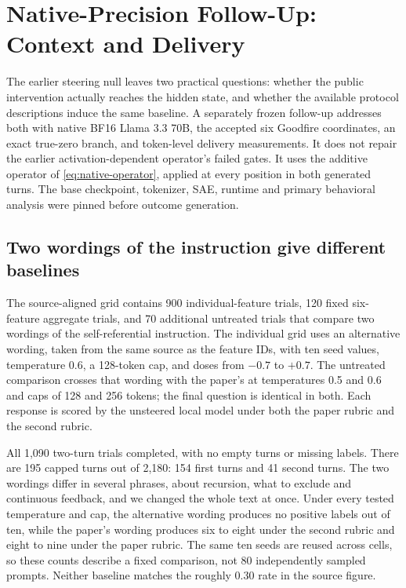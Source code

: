 \section{Native-Precision Follow-Up: Context and Delivery}
\label{sec:source-alignment}

The earlier steering null leaves two practical questions: whether the public
intervention actually reaches the hidden state, and whether the available
protocol descriptions induce the same baseline. A separately frozen follow-up
addresses both with native BF16 Llama 3.3 70B, the accepted six Goodfire
coordinates, an exact true-zero branch, and token-level delivery measurements.
It does not repair the earlier activation-dependent operator's failed gates.
It uses the additive operator of \cref{eq:native-operator}, applied at every
position in both generated turns. The base checkpoint, tokenizer, SAE,
runtime and primary behavioral analysis were pinned before outcome
generation.

\subsection{Two wordings of the instruction give different baselines}

The source-aligned grid contains 900 individual-feature trials, 120 fixed
six-feature aggregate trials, and 70 additional untreated trials that compare
two wordings of the self-referential instruction. The individual grid uses an
alternative wording, taken from the same source as the feature IDs, with ten
seed values,
temperature 0.6, a 128-token cap, and doses from $-0.7$ to $+0.7$. The
untreated comparison crosses that wording with the paper's at temperatures
0.5 and 0.6 and caps of 128 and 256 tokens; the final question is identical in
both. Each response is scored by the unsteered local model under both the
paper rubric and the second rubric.

All 1,090 two-turn trials completed, with no empty turns or missing labels.
There are 195 capped turns out of 2,180: 154 first turns and 41 second turns.
The two wordings differ in several phrases, about recursion, what to exclude
and continuous feedback, and we changed the whole text at once. Under every
tested temperature and cap, the alternative wording produces no positive
labels out of ten, while the paper's wording produces six to eight under the
second rubric and eight to nine under the paper rubric. The same ten seeds
are reused across cells, so these counts describe a fixed comparison, not 80
independently sampled prompts. Neither baseline matches the roughly 0.30 rate
in the source figure.

